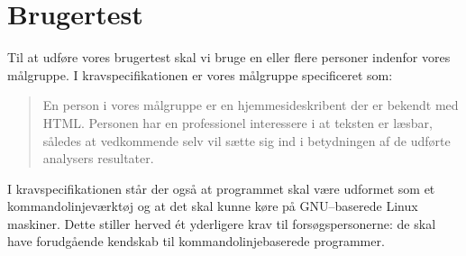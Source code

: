 \documentclass[a4paper,oneside,article, titlepage]{memoir}
\begin{document}
\chapter{Brugertest}

Til at udføre vores brugertest skal vi bruge en eller flere personer
indenfor vores målgruppe. I kravspecifikationen er vores målgruppe
specificeret som:
\begin{quote}
En person i vores målgruppe er en hjemmesideskribent der er bekendt
med HTML. Personen har en professionel interessere i at teksten er
læsbar, således at vedkommende selv vil sætte sig ind i betydningen af
de udførte analysers resultater.
\end{quote}

I kravspecifikationen står der også at programmet skal være udformet
som et kommandolinjeværktøj og at det skal kunne køre på GNU--baserede
Linux maskiner. Dette stiller herved ét yderligere krav til
forsøgspersonerne: de skal have forudgående kendskab til
kommando\-linje\-baserede programmer.
\end{document}
